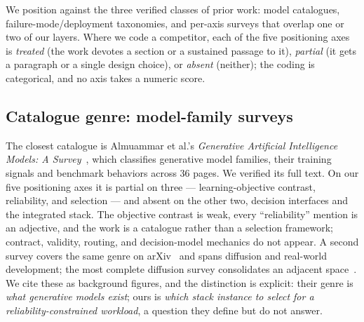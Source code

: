 We position against the three verified classes of prior work: model catalogues,
failure-mode/deployment taxonomies, and per-axis surveys that overlap one or two of our layers.
Where we code a competitor, each of the five positioning axes is \emph{treated} (the work
devotes a section or a sustained passage to it), \emph{partial} (it gets a paragraph or a single
design choice), or \emph{absent} (neither); the coding is categorical, and no axis takes a
numeric score.

\subsection{Catalogue genre: model-family surveys}
The closest catalogue is Almuammar et al.'s \emph{Generative Artificial Intelligence
Models: A Survey}~\cite{almuammar2026genai}, which classifies generative model families,
their training signals and benchmark behaviors across 36 pages. We verified its full text. On our
five positioning axes it is partial on three --- learning-objective contrast, reliability, and
selection --- and absent on the other two, decision interfaces and the integrated stack. The
objective contrast is weak, every ``reliability'' mention is an adjective, and the work is a
catalogue rather than a selection framework; contract, validity, routing, and decision-model
mechanics do not appear. A second survey covers the same genre on
arXiv~\cite{yazdani2025genaidepth} and spans diffusion and real-world development; the most
complete diffusion survey consolidates an adjacent
space~\cite{acm2023diffusionsurvey,zhan2025dlmsurvey}. We cite these as background figures, and
the distinction is explicit: their genre is \emph{what generative models exist}; ours
is \emph{which stack instance to select for a reliability-constrained workload}, a question
they define but do not answer.

